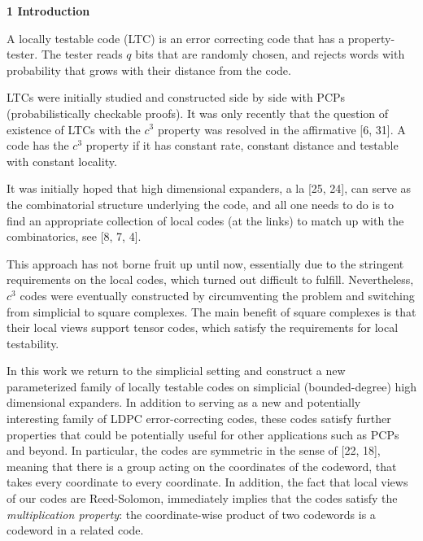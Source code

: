 

\par\medskip\noindent\textbf{
1 Introduction}\par




A locally testable code (LTC) is an error correcting code that has a property-tester. The tester reads $q$ bits that are randomly chosen, and rejects words with probability that grows with their distance from the code.\par




LTCs were initially studied and constructed side by side with PCPs (probabilistically checkable proofs). It was only recently that the question of existence of LTCs with the $c^{3}$ property was resolved in the affirmative [6, 31]. A code has the $c^{3}$ property if it has constant rate, constant distance and testable with constant locality.\par




It was initially hoped that high dimensional expanders, a la [25, 24], can serve as the combinatorial structure underlying the code, and all one needs to do is to find an appropriate collection of local codes (at the links) to match up with the combinatorics, see [8, 7, 4].\par




This approach has not borne fruit up until now, essentially due to the stringent requirements on the local codes, which turned out difficult to fulfill. Nevertheless, $c^{3}$ codes were eventually constructed by circumventing the problem and switching from simplicial to square complexes. The main benefit of square complexes is that their local views support tensor codes, which satisfy the requirements for local testability.\par




In this work we return to the simplicial setting and construct a new parameterized family of locally testable codes on simplicial (bounded-degree) high dimensional expanders.
In addition to serving as a new and potentially interesting family of LDPC error-correcting codes, these codes satisfy further properties that could be potentially useful for other applications such as PCPs and beyond. In particular, the codes are symmetric in the sense of [22, 18], meaning that there is a group acting on the coordinates of the codeword, that takes every coordinate to every coordinate. In addition, the fact that local views of our codes are Reed-Solomon, immediately implies that
the codes satisfy the \emph{multiplication property}: the coordinate-wise product of two codewords is a codeword in a related code.\par




